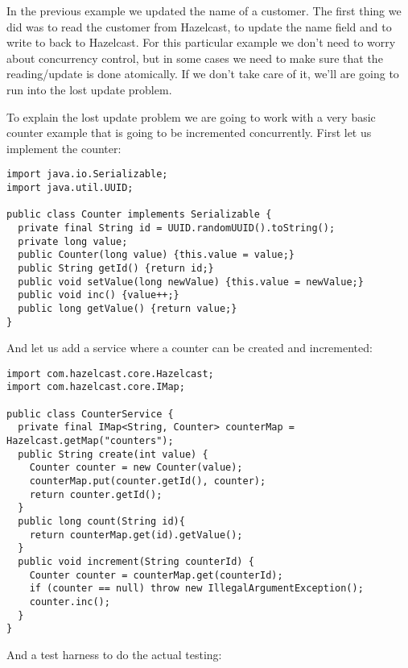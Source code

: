 In the previous example we updated the name of a customer. The first thing we did was to read the customer from Hazelcast, to update the name field and to write to back to Hazelcast. For this particular example we don't need to worry about concurrency control, but in some cases we need to make sure that the reading/update is done atomically. If we don't take care of it, we'll are going to run into the lost update problem.

To explain the lost update problem we are going to work with a very basic counter example that is
going to be incremented concurrently. First let us implement the counter:

\begin{verbatim}
import java.io.Serializable;
import java.util.UUID;

public class Counter implements Serializable {
  private final String id = UUID.randomUUID().toString();
  private long value;
  public Counter(long value) {this.value = value;}
  public String getId() {return id;}
  public void setValue(long newValue) {this.value = newValue;}
  public void inc() {value++;}
  public long getValue() {return value;}
}
\end{verbatim}

And let us add a service where a counter can be created and incremented:

\begin{verbatim}
import com.hazelcast.core.Hazelcast;
import com.hazelcast.core.IMap;

public class CounterService {
  private final IMap<String, Counter> counterMap = Hazelcast.getMap("counters");
  public String create(int value) {
    Counter counter = new Counter(value);
    counterMap.put(counter.getId(), counter);
    return counter.getId();
  }
  public long count(String id){
    return counterMap.get(id).getValue();
  }
  public void increment(String counterId) {
    Counter counter = counterMap.get(counterId);
    if (counter == null) throw new IllegalArgumentException();
    counter.inc();
  }
}
\end{verbatim}

And a test harness to do the actual testing:

